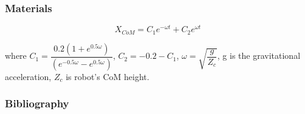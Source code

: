 \documentclass{beamer}
\begin{document}
	\begin{frame}
		\frametitle{Materials} 
		
		\begin{equation}
		X_{CoM} = C_1 e^{-\omega t} + C_2 e^{\omega t}
		\end{equation}
		
		where $C_1 = \dfrac{0.2(1+e^{0.5\omega })}{(e^{-0.5\omega }-e^{0.5\omega })}$, $C_2=-0.2-C_1$, $\omega = \sqrt{\dfrac{g}{Z_c}}$, g is the gravitational acceleration, $Z_c$ is robot's CoM height.
	\end{frame}
	

	\begin{frame}[allowframebreaks]
		\frametitle{Bibliography}    
			
			
	\end{frame}
		
\end{document}
